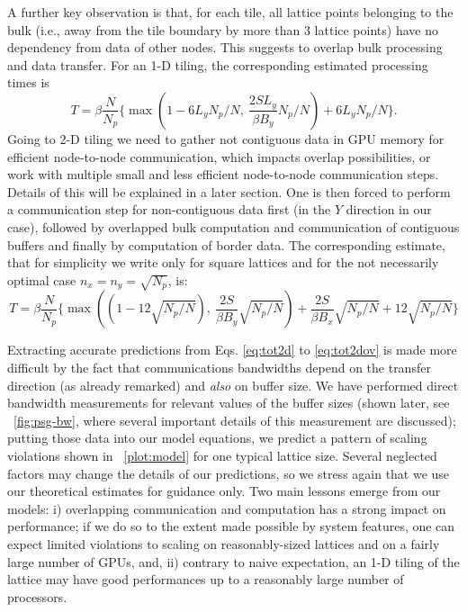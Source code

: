 \documentclass{elsarticle}
\begin{document}
A further key observation is that, for each tile, all lattice points belonging 
to the bulk (i.e., away from the tile boundary by more than $3$ lattice points) 
have no dependency from data of other nodes. This suggests to overlap bulk 
processing and data transfer. For an 1-D tiling, the corresponding estimated processing times is
\begin{equation}
T = \beta \frac{N}{N_p} \{ \max{(1- 6L_y N_p/N , ~\frac{2SL_y}{\beta B_y} N_p/N)} +6 L_y N_p/N \}.
\label{eq:tot1dov}
\end{equation}
%
Going to 2-D tiling we need to gather not contiguous data in GPU memory for 
efficient node-to-node communication, which impacts overlap possibilities, 
or work with multiple small and less efficient node-to-node communication steps.  
Details of this will be explained in a later section.
%
One is then forced to perform a communication step for non-contiguous data first
(in the $Y$ direction in our case), followed by overlapped bulk computation 
and communication of contiguous buffers and finally by computation of border data. 
The corresponding estimate, that for simplicity we write only for square lattices and for the
not necessarily optimal case $n_x = n_y = \sqrt{N_p}$, is:
\begin{equation}						 
T = \beta \frac{N}{N_p} \{ \max{((1 - 12 \sqrt{N_p/N}), ~\frac{2S}{\beta B_y} \sqrt{N_p/N}) } + \frac{2S}{ \beta B_x} \sqrt{N_p/N} 
+ 12 \sqrt{N_p/N}   \}
\label{eq:tot2dov} 
\end{equation}

Extracting accurate predictions from Eqs. \ref{eq:tot2d} to \ref{eq:tot2dov} 
is made more difficult by the fact that communications bandwidths depend on 
the transfer direction (as already remarked) and {\em also} on buffer size. 
We have performed direct bandwidth measurements for relevant values of the buffer sizes 
(shown later, see \figurename~\ref{fig:psg-bw}, where several important details 
of this measurement are discussed); 
putting those data into our model equations, 
we predict a pattern of scaling violations shown in \figurename~\ref{plot:model} for one typical lattice size. 
Several neglected factors may change the details of our predictions, 
so we stress again that we use our theoretical estimates for guidance only. 
Two main lessons emerge from our models: i) overlapping communication and 
computation has a strong impact on performance; if we do so to the extent 
made possible by system features, one can expect limited violations 
to scaling on reasonably-sized lattices and on a fairly large number of GPUs, 
and, ii) contrary to naive expectation, an 1-D tiling of the lattice may 
have good performances up to a reasonably large number of processors.
\end{document}
